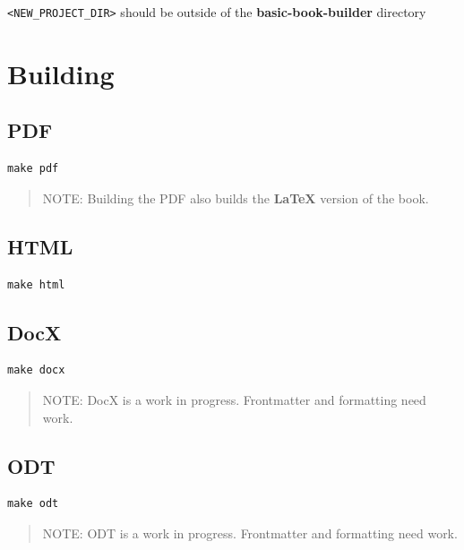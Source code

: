 \documentclass[
  12pt,
  openany]{book}
\begin{document}
\begin{warningbox}[Warning]
\texttt{\textless{}NEW\_PROJECT\_DIR\textgreater{}} should be outside of
the \textbf{basic-book-builder} directory
\end{warningbox}

\section{Building}\label{building}

\subsection{PDF}\label{pdf}

\begin{verbatim}
make pdf
\end{verbatim}

\begin{quote}
NOTE: Building the PDF also builds the \textbf{LaTeX} version of the
book.
\end{quote}

\subsection{HTML}\label{html}

\begin{verbatim}
make html
\end{verbatim}

\subsection{DocX}\label{docx}

\begin{verbatim}
make docx
\end{verbatim}

\begin{quote}
NOTE: DocX is a work in progress. Frontmatter and formatting need work.
\end{quote}

\subsection{ODT}\label{odt}

\begin{verbatim}
make odt
\end{verbatim}

\begin{quote}
NOTE: ODT is a work in progress. Frontmatter and formatting need work.
\end{quote}
\end{document}
